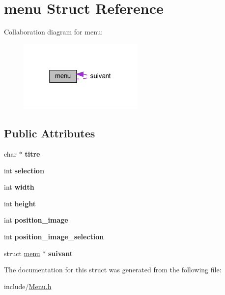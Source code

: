 \hypertarget{structmenu}{}\section{menu Struct Reference}
\label{structmenu}


Collaboration diagram for menu\+:
\nopagebreak
\begin{figure}[H]
\begin{center}
\leavevmode
\includegraphics[width=174pt]{structmenu__coll__graph}
\end{center}
\end{figure}
\subsection*{Public Attributes}
\begin{DoxyCompactItemize}
\item 
\mbox{\label{structmenu_a94c62403c38b48b26fb2f5e994c31ea2}} 
char $\ast$ {\bfseries titre}
\item 
\mbox{\label{structmenu_a6387707c8483564603c2e6c388402601}} 
int {\bfseries selection}
\item 
\mbox{\label{structmenu_ab89c27fd04e5bb0621c23a494f0de7fb}} 
int {\bfseries width}
\item 
\mbox{\label{structmenu_a0a7d04746299a9cc0ae324e6ad139c04}} 
int {\bfseries height}
\item 
\mbox{\label{structmenu_a278fca0303de575642acf7b3fe1a8178}} 
int {\bfseries position\+\_\+image}
\item 
\mbox{\label{structmenu_a016dc5e60a070b54cfc3a4db655b5f0b}} 
int {\bfseries position\+\_\+image\+\_\+selection}
\item 
\mbox{\label{structmenu_a3e86c4012596c6f1f2e93d44bceaf8b7}} 
struct \hyperlink{structmenu}{menu} $\ast$ {\bfseries suivant}
\end{DoxyCompactItemize}


The documentation for this struct was generated from the following file\+:\begin{DoxyCompactItemize}
\item 
include/\hyperlink{_menu_8h}{Menu.\+h}\end{DoxyCompactItemize}
